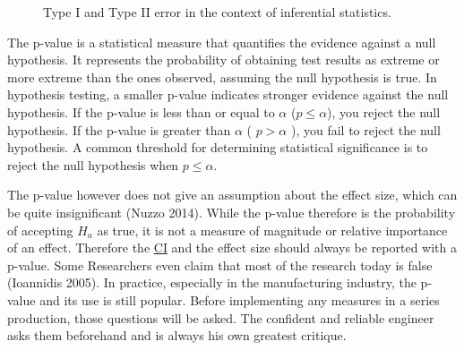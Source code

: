 \documentclass[
  a4paper,
]{scrbook}
\begin{document}
\begin{figure}[ht]


\caption{\label{fig-stat-rates}Type I and Type II error in the context
of inferential statistics.}

\end{figure}%

The p-value is a statistical measure that quantifies the evidence
against a null hypothesis. It represents the probability of obtaining
test results as extreme or more extreme than the ones observed, assuming
the null hypothesis is true. In hypothesis testing, a smaller p-value
indicates stronger evidence against the null hypothesis. If the p-value
is less than or equal to \(\alpha\) (\(p \leq \alpha\)), you reject the
null hypothesis. If the p-value is greater than \(\alpha\) (
\(p > \alpha\) ), you fail to reject the null hypothesis. A common
threshold for determining statistical significance is to reject the null
hypothesis when \(p\leq\alpha\).

The p-value however does not give an assumption about the effect size,
which can be quite insignificant (Nuzzo 2014). While the p-value
therefore is the probability of accepting \(H_a\) as true, it is not a
measure of magnitude or relative importance of an effect. Therefore the
\hyperref[ci]{CI} and the effect size should always be reported with a
p-value. Some Researchers even claim that most of the research today is
false (Ioannidis 2005). In practice, especially in the manufacturing
industry, the p-value and its use is still popular. Before implementing
any measures in a series production, those questions will be asked. The
confident and reliable engineer asks them beforehand and is always his
own greatest critique.
\end{document}
